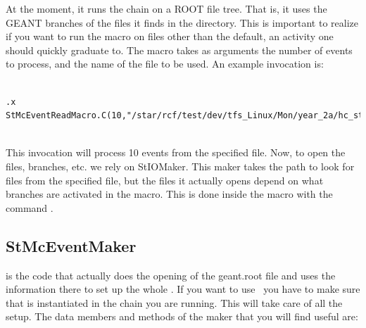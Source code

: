 
At the moment, it runs the chain on a ROOT file tree.  That is, it uses
the GEANT branches of the files it finds in the directory.  This is important to
realize if you want to run the macro on files other than the default, an
activity one should quickly graduate to.  The macro takes as arguments the
number of events to process, and the name of the file to be used.  An example invocation
is:

{\footnotesize

\begin{verbatim}

.x StMcEventReadMacro.C(10,"/star/rcf/test/dev/tfs_Linux/Mon/year_2a/hc_standard/*.geant.root")
     

\end{verbatim}
}
This invocation will process 10 events from the specified file.
Now, to open the files, branches, etc. we rely on StIOMaker.  This maker
takes the path to look for files from the specified file, but the files
it actually
opens depend on
what branches are activated in the macro.
This is done inside the macro with the command .

\subsection{StMcEventMaker}
 is the code that actually does the opening of
the geant.root file and uses the information there to set up the
whole \StMcEvent .  If you want to use \StMcEvent\ you have to make
sure that  is instantiated in the chain you
are running.  This will take care of all the setup.  The data
members and methods of the maker that you will find useful are:

